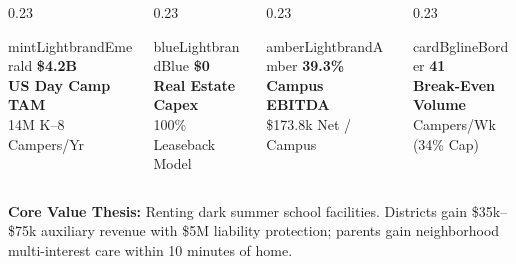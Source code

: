 \documentclass[aspectratio=169,9pt]{beamer}
\begin{document}
\begin{frame}[plain]
\vskip6pt
\begin{columns}[T]
  \begin{column}{0.23\textwidth}
    \begin{execbox}{mintLight}{brandEmerald}
      \centering
      \textcolor{brandEmerald}{\textbf{\Large \$4.2B}} \\[1pt]
      \textcolor{brandNavy}{\textbf{\tiny US Day Camp TAM}} \\[1pt]
      \tiny 14M K--8 Campers/Yr
    \end{execbox}
  \end{column}
  \begin{column}{0.23\textwidth}
    \begin{execbox}{blueLight}{brandBlue}
      \centering
      \textcolor{brandBlue}{\textbf{\Large \$0}} \\[1pt]
      \textcolor{brandNavy}{\textbf{\tiny Real Estate Capex}} \\[1pt]
      \tiny 100\% Leaseback Model
    \end{execbox}
  \end{column}
  \begin{column}{0.23\textwidth}
    \begin{execbox}{amberLight}{brandAmber}
      \centering
      \textcolor{brandAmber}{\textbf{\Large 39.3\%}} \\[1pt]
      \textcolor{brandNavy}{\textbf{\tiny Campus EBITDA}} \\[1pt]
      \tiny \$173.8k Net / Campus
    \end{execbox}
  \end{column}
  \begin{column}{0.23\textwidth}
    \begin{execbox}{cardBg}{lineBorder}
      \centering
      \textcolor{brandNavy}{\textbf{\Large 41}} \\[1pt]
      \textcolor{brandNavy}{\textbf{\tiny Break-Even Volume}} \\[1pt]
      \tiny Campers/Wk (34\% Cap)
    \end{execbox}
  \end{column}
\end{columns}

\vskip8pt
\begin{center}
  \textcolor{brandSlate}{\scriptsize \textbf{Core Value Thesis:} Renting dark summer school facilities. Districts gain \$35k--\$75k auxiliary revenue with \$5M liability protection; parents gain neighborhood multi-interest care within 10 minutes of home.}
\end{center}
\end{frame}
\end{document}
